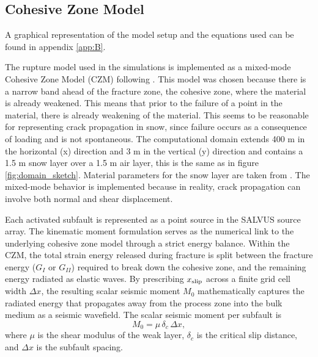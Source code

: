 \subsection{Cohesive Zone Model}
\label{sec:czm_methods}

A graphical representation of the model setup and the equations used can be found in appendix \ref{app:B}.

The rupture model used in the simulations is implemented as a mixed-mode Cohesive Zone Model (CZM) following \cite{mahajanModelingInterfacialCrack2008}. This model was chosen because there is a narrow band ahead of the fracture zone, the cohesive zone, where the material is already weakened. This means that prior to the failure of a point in the material, there is already weakening of the material. This seems to be reasonable for representing crack propagation in snow, since failure occurs as a consequence of loading and is not spontaneous. The computational domain extends 400 m in the horizontal (x) direction and 3 m in the vertical (y) direction and contains a 1.5 m snow layer over a 1.5 m air layer, this is the same as in figure \ref{fig:domain_sketch}. Material parameters for the snow layer are taken from \cite{guillemotEffectSnowfallChanges2021}. The mixed-mode behavior is implemented because in reality, crack propagation can involve both normal and shear displacement.  \par

Each activated subfault is represented as a point source in the SALVUS source array. The kinematic moment formulation serves as the numerical link to the underlying cohesive zone model through a strict energy balance. Within the CZM, the total strain energy released during fracture is split between the fracture energy ($G_I$ or $G_{II}$) required to break down the cohesive zone, and the remaining energy radiated as elastic waves. By prescribing $x_{\rm slip}$ across a finite grid cell width $\Delta x$, the resulting scalar seismic moment $M_0$ mathematically captures the  radiated energy that propagates away from the process zone into the bulk medium as a seismic wavefield. The scalar seismic moment per subfault is
\begin{equation}
    M_0 = \mu\,\delta_c\,\Delta x,
\end{equation}
where $\mu$ is the shear modulus of the weak layer, $\delta_c$ is the critical slip distance, and $\Delta x$ is the subfault spacing. \par

